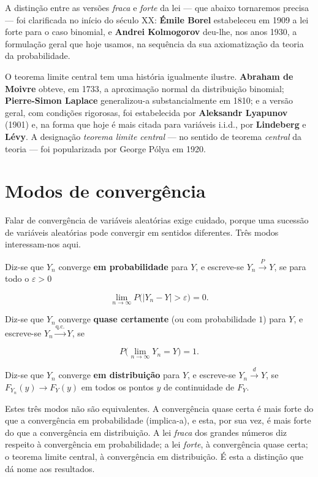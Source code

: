 \documentclass[
  portuguese,
  11pt,
  openany]{book}
\begin{document}
A distinção entre as versões \emph{fraca} e \emph{forte} da lei --- que abaixo tornaremos
precisa --- foi clarificada no início do século XX: \textbf{Émile Borel} estabeleceu em
1909 a lei forte para o caso binomial, e \textbf{Andrei Kolmogorov} deu-lhe, nos anos
1930, a formulação geral que hoje usamos, na sequência da sua axiomatização da
teoria da probabilidade.

O teorema limite central tem uma história igualmente ilustre. \textbf{Abraham de
Moivre} obteve, em 1733, a aproximação normal da distribuição binomial;
\textbf{Pierre-Simon Laplace} generalizou-a substancialmente em 1810; e a versão
geral, com condições rigorosas, foi estabelecida por \textbf{Aleksandr Lyapunov}
(1901) e, na forma que hoje é mais citada para variáveis i.i.d., por
\textbf{Lindeberg} e \textbf{Lévy}. A designação \emph{teorema limite central} --- no sentido de
teorema \emph{central} da teoria --- foi popularizada por George Pólya em 1920.

\section{Modos de convergência}\label{modos-de-converguxeancia}

Falar de convergência de variáveis aleatórias exige cuidado, porque uma
sucessão de variáveis aleatórias pode convergir em sentidos diferentes. Três
modos interessam-nos aqui.

Diz-se que \(Y_n\) converge \textbf{em probabilidade} para \(Y\), e escreve-se
\(Y_n \xrightarrow{P} Y\), se para todo o \(\varepsilon > 0\)

\[
\lim_{n \to \infty} P\big(|Y_n - Y| > \varepsilon\big) = 0.
\]

Diz-se que \(Y_n\) converge \textbf{quase certamente} (ou com probabilidade \(1\)) para
\(Y\), e escreve-se \(Y_n \xrightarrow{\text{q.c.}} Y\), se

\[
P\Big(\lim_{n \to \infty} Y_n = Y\Big) = 1.
\]

Diz-se que \(Y_n\) converge \textbf{em distribuição} para \(Y\), e escreve-se
\(Y_n \xrightarrow{d} Y\), se \(F_{Y_n}(y) \to F_Y(y)\) em todos os pontos \(y\) de
continuidade de \(F_Y\).

Estes três modos não são equivalentes. A convergência quase certa é mais forte
do que a convergência em probabilidade (implica-a), e esta, por sua vez, é mais
forte do que a convergência em distribuição. A lei \emph{fraca} dos grandes números
diz respeito à convergência em probabilidade; a lei \emph{forte}, à convergência
quase certa; o teorema limite central, à convergência em distribuição. É esta a
distinção que dá nome aos resultados.
\end{document}
